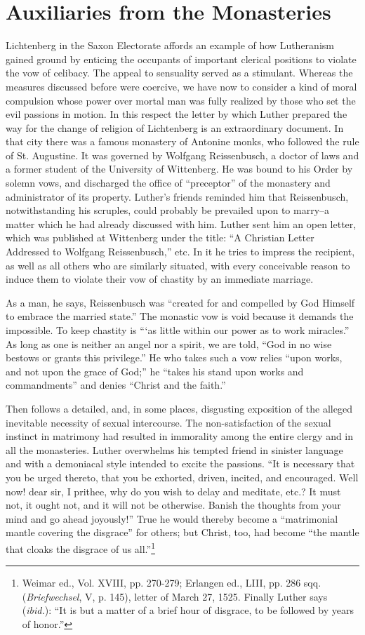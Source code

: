 \section{Auxiliaries from the Monasteries}

Lichtenberg in the Saxon Electorate affords an example of how
Lutheranism gained ground by enticing the occupants of important
clerical positions to violate the vow of celibacy. The appeal to sensuality
served as a stimulant. Whereas the measures discussed before
were coercive, we have now to consider a kind of moral compulsion
whose power over mortal man was fully realized by those who set the
evil passions in motion. In this respect the letter by which Luther
prepared the way for the change of religion of Lichtenberg is an
extraordinary document. In that city there was a famous monastery
of Antonine monks, who followed the rule of St. Augustine. It was
governed by Wolfgang Reissenbusch, a doctor of laws and a former
student of the University of Wittenberg. He was bound to his Order
by solemn vows, and discharged the office of “preceptor” of the
monastery and administrator of its property. Luther’s friends reminded
him that Reissenbusch, notwithstanding his scruples, could
probably be prevailed upon to marry--a matter which he had already
discussed with him. Luther sent him an open letter, which was published
at Wittenberg under the title: “A Christian Letter Addressed
to Wolfgang Reissenbusch,” etc. In it he tries to impress the recipient,
as well as all others who are similarly situated, with every conceivable
reason to induce them to violate their vow of chastity by an immediate marriage.

As a man, he says, Reissenbusch was “created for and compelled by God
Himself to embrace the married state.” The monastic vow is void because it
demands the impossible. To keep chastity is “‘as little within our power as
to work miracles.” As long as one is neither an angel nor a spirit, we are
told, “God in no wise bestows or grants this privilege.” He who takes such a
vow relies “upon works, and not upon the grace of God;” he “takes his
stand upon works and commandments” and denies “Christ and the faith.”

Then follows a detailed, and, in some places, disgusting exposition of the
alleged inevitable necessity of sexual intercourse. The non-satisfaction of
the sexual instinct in matrimony had resulted in immorality among the
entire clergy and in all the monasteries. Luther overwhelms his tempted
friend in sinister language and with a demoniacal style intended to excite the
passions. “It is necessary that you be urged thereto, that you be exhorted,
driven, incited, and encouraged. Well now! dear sir, I prithee, why do
you wish to delay and meditate, etc.? It must not, it ought not, and it will
not be otherwise. Banish the thoughts from your mind and go ahead joyously!”
True he would thereby become a “matrimonial mantle covering the
disgrace” for others; but Christ, too, had become “the mantle that cloaks the
disgrace of us all.”\footnote
{Weimar ed., Vol. XVIII, pp. 270-279; Erlangen ed., LIII, pp. 286 sqq. (\textit{Briefwechsel},
V, p. 145), letter of March 27, 1525. Finally Luther says (\textit{ibid.}): “It is but a matter of a
brief hour of disgrace, to be followed by years of honor.”}


